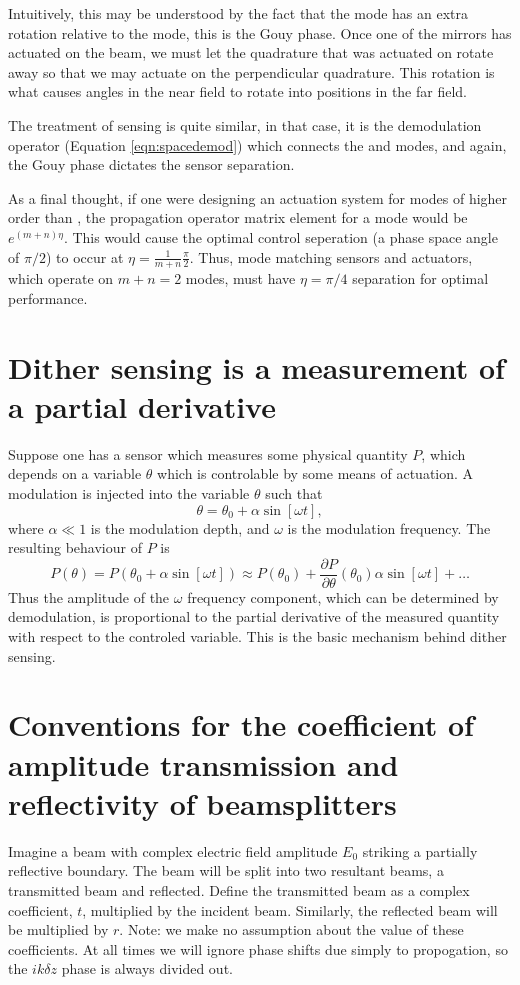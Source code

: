 Intuitively, this may be understood by the fact that the  mode has an extra rotation relative to the  mode, this is the Gouy phase. %
Once one of the mirrors has actuated on the beam, we must let the quadrature that was actuated on rotate away so that we may actuate on the perpendicular quadrature. %
This rotation is what causes angles in the near field to rotate into positions in the far field. %


The treatment of sensing is quite similar, in that case, it is the demodulation operator (Equation \ref{eqn:spacedemod}) which connects the  and  modes, and again, the Gouy phase dictates the sensor separation.

As a final thought, if one were designing an actuation system for modes of higher order than , the propagation operator matrix element for a  mode would be $e^{(m+n)\eta}$. %
This would cause the optimal control seperation (a phase space angle of $\pi/2$) to occur at $\eta=\frac{1}{m+n}\frac{\pi}{2}$. %
Thus, mode matching sensors and actuators, which operate on $m+n=2$ modes, must have  $\eta=\pi/4$ separation for optimal performance.

\section{Dither sensing is a measurement of a partial derivative}
\label{sec:dithersens}
Suppose one has a sensor which measures some physical quantity $P$, which depends on a variable $\theta$ which is controlable by some means of actuation. %
A modulation is injected into the variable $\theta$ such that
\begin{equation}
\theta = \theta_0+\alpha \sin[\omega t],
\end{equation}
where $\alpha \ll 1$ is the modulation depth, and $\omega$ is the modulation frequency. %
The resulting behaviour of $P$ is
\begin{equation}
P(\theta)=P(\theta_0+\alpha \sin[\omega t])\approx P(\theta_0)+\frac{\partial P}{\partial \theta}(\theta_0)\alpha \sin[\omega t] + \ldots
\end{equation}
Thus the amplitude of the $\omega$ frequency component, which can be determined by demodulation, is proportional to the partial derivative of the measured quantity with respect to the controled variable. %
This is the basic mechanism behind dither sensing.
\section{Conventions for the coefficient of amplitude transmission and reflectivity of beamsplitters}
Imagine a beam with complex electric field amplitude $E_0$ striking a partially reflective boundary. %
The beam will be split into two resultant beams, a transmitted beam and reflected. %
Define the transmitted beam as a complex coefficient, $t$, multiplied by the incident beam. %
Similarly, the reflected beam will be multiplied by $r$. %
Note: we make no assumption about the value of these coefficients. %
At all times we will ignore phase shifts due simply to propogation, so the $ik\delta z$ phase is always divided out.

